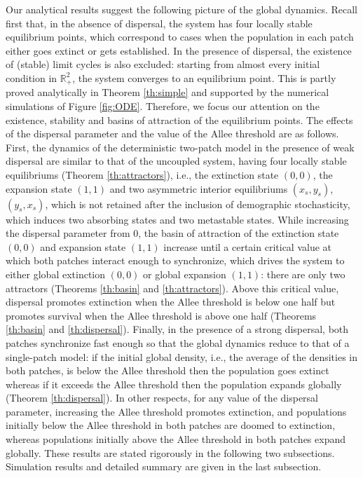 \indent Our analytical results suggest the following picture of the global dynamics.
 Recall first that, in the absence of dispersal, the system has four locally stable equilibrium points, which correspond to cases
 when the population in each patch either goes extinct or gets established.
 In the presence of dispersal, the existence of (stable) limit cycles is also excluded: starting from almost every initial condition
 in ${{\mathbb{R}}}_+^2$, the system converges to an equilibrium point.
 This is partly proved analytically in Theorem \ref{th:simple} and supported by the numerical simulations of Figure \ref{fig:ODE}.
 Therefore, we focus our attention on the existence, stability and basins of attraction of the equilibrium points.
 The effects of the dispersal parameter and the value of the Allee threshold are as follows.
 First, the dynamics of the deterministic two-patch model in the presence of weak dispersal are similar to that of the uncoupled
 system, having four locally stable equilibriums (Theorem \ref{th:attractors}), i.e., the extinction state $(0, 0)$, the expansion
 state $(1, 1)$ and two asymmetric interior equilibriums $(x_s,y_s)$, $(y_s, x_s)$, which is not retained after the inclusion of
 demographic stochasticity, which induces two absorbing states and two metastable states.
 While increasing the dispersal parameter from 0, the basin of attraction of the extinction state $(0, 0)$ and expansion state
 $(1, 1)$ increase until a certain critical value at which both patches interact enough to synchronize, which drives the system
 to either global extinction $(0, 0)$ or global expansion $(1, 1)$:
 there are only two attractors (Theorems \ref{th:basin} and \ref{th:attractors}).
 Above this critical value, dispersal promotes extinction when the Allee threshold is below one half but promotes survival when
 the Allee threshold is above one half (Theorems \ref{th:basin} and \ref{th:dispersal}).
 Finally, in the presence of a strong dispersal, both patches synchronize fast enough so that the global dynamics reduce to
 that of a single-patch model: if the initial global density, i.e., the average of the densities in both patches, is below the
 Allee threshold then the population goes extinct whereas if it exceeds the Allee threshold then the population expands
 globally (Theorem \ref{th:dispersal}).
 In other respects, for any value of the dispersal parameter, increasing the Allee threshold promotes extinction, and populations
 initially below the Allee threshold in both patches are doomed to extinction, whereas populations initially above the Allee
 threshold in both patches expand globally.
 These results are stated rigorously in the following two subsections. Simulation results and detailed summary are given in the
 last subsection.

